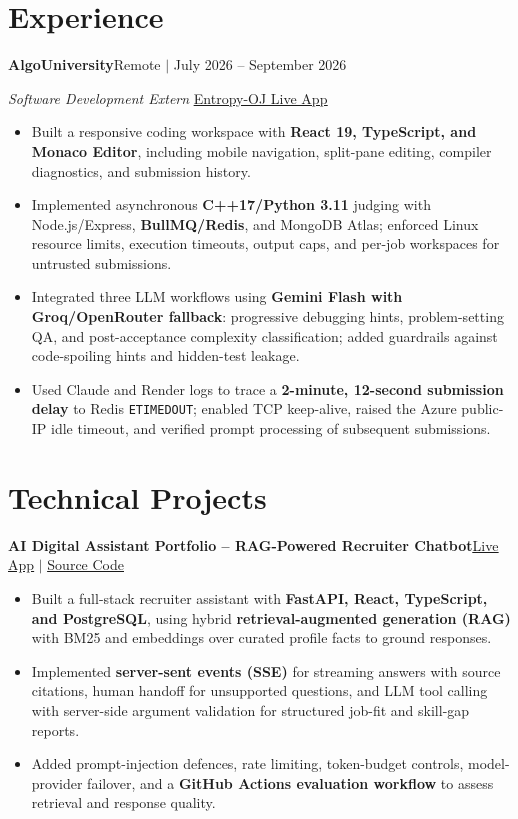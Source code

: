 \documentclass[a4paper,10pt]{article}
\newcommand{\resumeEntry}[2]{%
  \textbf{#1}\hfill {\small #2}\par\vspace{1pt}%
}
\newcommand{\resumeBullet}[1]{\item #1}
\begin{document}
\section{Experience}
\resumeEntry{AlgoUniversity}{Remote $|$ July 2026 -- September 2026}
\textit{Software Development Extern}
\hfill \href{https://entropy-oj.vercel.app}{\underline{Entropy-OJ Live App}}
\begin{itemize}
  \resumeBullet{Built a responsive coding workspace with \textbf{React 19, TypeScript, and Monaco Editor}, including mobile navigation, split-pane editing, compiler diagnostics, and submission history.}
  \resumeBullet{Implemented asynchronous \textbf{C++17/Python 3.11} judging with Node.js/Express, \textbf{BullMQ/Redis}, and MongoDB Atlas; enforced Linux resource limits, execution timeouts, output caps, and per-job workspaces for untrusted submissions.}
  \resumeBullet{Integrated three LLM workflows using \textbf{Gemini Flash with Groq/OpenRouter fallback}: progressive debugging hints, problem-setting QA, and post-acceptance complexity classification; added guardrails against code-spoiling hints and hidden-test leakage.}
  \resumeBullet{Used Claude and Render logs to trace a \textbf{2-minute, 12-second submission delay} to Redis \texttt{ETIMEDOUT}; enabled TCP keep-alive, raised the Azure public-IP idle timeout, and verified prompt processing of subsequent submissions.}
\end{itemize}

\section{Technical Projects}
\resumeEntry{AI Digital Assistant Portfolio -- RAG-Powered Recruiter Chatbot}
{\href{https://aamirmk-portfolio.vercel.app/}{\underline{Live App}} $|$ \href{https://github.com/aamir-coding/aamirmk-portfolio}{\underline{Source Code}}}
\begin{itemize}
  \resumeBullet{Built a full-stack recruiter assistant with \textbf{FastAPI, React, TypeScript, and PostgreSQL}, using hybrid \textbf{retrieval-augmented generation (RAG)} with BM25 and embeddings over curated profile facts to ground responses.}
  \resumeBullet{Implemented \textbf{server-sent events (SSE)} for streaming answers with source citations, human handoff for unsupported questions, and LLM tool calling with server-side argument validation for structured job-fit and skill-gap reports.}
  \resumeBullet{Added prompt-injection defences, rate limiting, token-budget controls, model-provider failover, and a \textbf{GitHub Actions evaluation workflow} to assess retrieval and response quality.}
\end{itemize}
\end{document}
